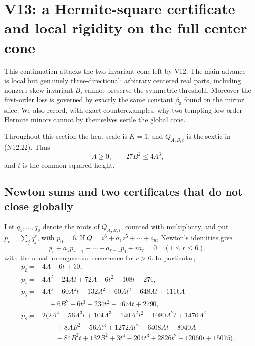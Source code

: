 \documentclass[11pt]{article}
\theoremstyle{definition}
\theoremstyle{remark}
\begin{document}
\section{V13: a Hermite-square certificate and local rigidity on the full center cone}

This continuation attacks the two-invariant cone left by V12.  The main
advance is local but genuinely three-directional: arbitrary centered real
parts, including nonzero skew invariant \(B\), cannot preserve the symmetric
threshold.  Moreover the first-order loss is governed by exactly the same
constant \(\beta _3\) found on the mirror slice.  We also record, with exact
counterexamples, why two tempting low-order Hermite minors cannot by
themselves settle the global cone.

Throughout this section the heat scale is \(K=1\), and
\(Q_{A,B,t}\) is the sextic in \textup{(N12.22)}.  Thus
\[
 A\geq0,\qquad 27B^2\leq4A^3,
 \tag{N13.1}
\]
and \(t\) is the common squared height.

\subsection{Newton sums and two certificates that do not close globally}

Let \(q_1,\ldots,q_6\) denote the roots of \(Q_{A,B,t}\), counted with
multiplicity, and put \(p_r=\sum_jq_j^r\), with \(p_0=6\).  If
\(Q=z^6+a_1z^5+\cdots+a_6\), Newton's identities give
\[
 p_r+a_1p_{r-1}+\cdots+a_{r-1}p_1+ra_r=0
 \quad(1\leq r\leq6),
 \tag{N13.2}
\]
with the usual homogeneous recurrence for \(r>6\).  In particular,
\[
\begin{aligned}
 p_2={}&4A-6t+30,\\
 p_4={}&4A^2-24At+72A+6t^2-108t+270,\\
 p_6={}&4A^3-60A^2t+132A^2+60At^2-648At+1116A\\
      &\quad+6B^2-6t^3+234t^2-1674t+2790,\\
 p_8={}&2\bigl(2A^4-56A^3t+104A^3+140A^2t^2-1080A^2t
                  +1476A^2\\
      &\qquad+8AB^2-56At^3+1272At^2-6408At+8040A\\
      &\qquad-84B^2t+132B^2+3t^4-204t^3+2826t^2
                  -12060t+15075\bigr).
\end{aligned}
\tag{N13.3}
\]
\end{document}
